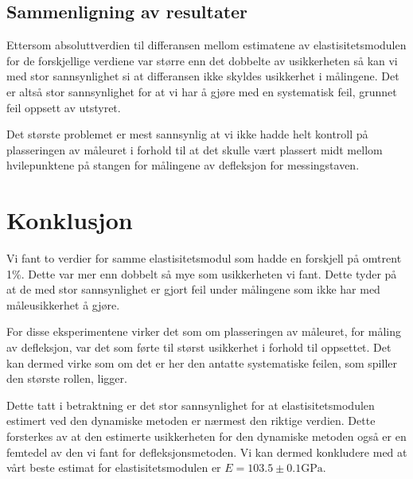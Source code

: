 \documentclass[a4paper,11pt, twocolumn]{article}
\begin{document}
\subsection{Sammenligning av resultater}
Ettersom absoluttverdien til differansen mellom estimatene av elastisitetsmodulen for de forskjellige verdiene var større enn det dobbelte av usikkerheten så kan vi med stor sannsynlighet si at differansen ikke skyldes usikkerhet i målingene. Det er altså stor sannsynlighet for at vi har å gjøre med en systematisk feil, grunnet feil oppsett av utstyret.

Det største problemet er mest sannsynlig at vi ikke hadde helt kontroll på plasseringen av måleuret i forhold til at det skulle vært plassert midt mellom hvilepunktene på stangen for målingene av defleksjon for messingstaven. 

\section{Konklusjon}
Vi fant to verdier for samme elastisitetsmodul som hadde en forskjell på omtrent 1\%. Dette var mer enn dobbelt så mye som usikkerheten vi fant. Dette tyder på at de med stor sannsynlighet er gjort feil under målingene som ikke har med måleusikkerhet å gjøre. 

For disse eksperimentene virker det som om plasseringen av måleuret, for måling av defleksjon, var det som førte til størst usikkerhet i forhold til oppsettet. Det kan dermed virke som om det er her den antatte systematiske feilen, som spiller den største rollen, ligger.

Dette tatt i betraktning er det stor sannsynlighet for at elastisitetsmodulen estimert ved den dynamiske metoden er nærmest den riktige verdien. Dette forsterkes av at den estimerte usikkerheten for den dynamiske metoden også er en femtedel av den vi fant for defleksjonsmetoden. Vi kan dermed konkludere med at vårt beste estimat for elastisitetsmodulen er $E = 103.5\pm0.1\text{GPa}$.

\printbibliography
\clearpage
\onecolumn
\appendix


\end{document}
